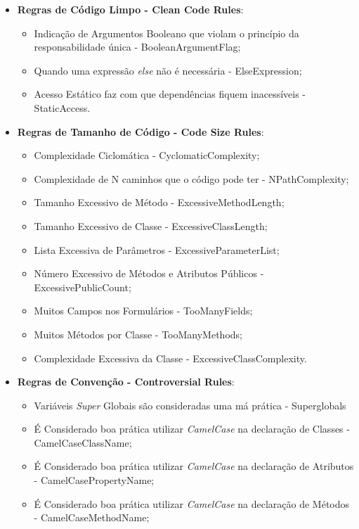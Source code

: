 \begin{itemize}
  \item \textbf{Regras de Código Limpo - Clean Code Rules}:
		\begin{itemize}
			\item Indicação de Argumentos Booleano que violam o princípio da
						responsabilidade única - BooleanArgumentFlag;
			\item Quando uma expressão \textit{else} não é necessária - ElseExpression;
			\item Acesso Estático faz com que dependências fiquem inacessíveis - StaticAccess.
		\end{itemize}
  \item \textbf{Regras de Tamanho de Código - Code Size Rules}:
		\begin{itemize}
			\item Complexidade Ciclomática - CyclomaticComplexity;
			\item Complexidade de N caminhos que o código pode ter - NPathComplexity;
			\item Tamanho Excessivo de Método - ExcessiveMethodLength;
			\item Tamanho Excessivo de Classe - ExcessiveClassLength;
			\item Lista Excessiva de Parâmetros - ExcessiveParameterList;
			\item Número Excessivo de Métodos e Atributos Públicos - ExcessivePublicCount;
			\item Muitos Campos nos Formulários - TooManyFields;
			\item Muitos Métodos por Classe - TooManyMethods;
			\item Complexidade Excessiva da Classe - ExcessiveClassComplexity.
		\end{itemize}
  \item \textbf{Regras de Convenção - Controversial Rules}:
		\begin{itemize}
			\item Variáveis \textit{Super} Globais são consideradas uma má prática  -
            Superglobals
			\item É Considerado boa prática utilizar \textit{CamelCase} na declaração
            de Classes - CamelCaseClassName;
			\item É Considerado boa prática utilizar \textit{CamelCase} na declaração
            de Atributos - CamelCasePropertyName;
			\item É Considerado boa prática utilizar \textit{CamelCase} na declaração
            de Métodos - CamelCaseMethodName;

\end{itemize}
\end{itemize}
